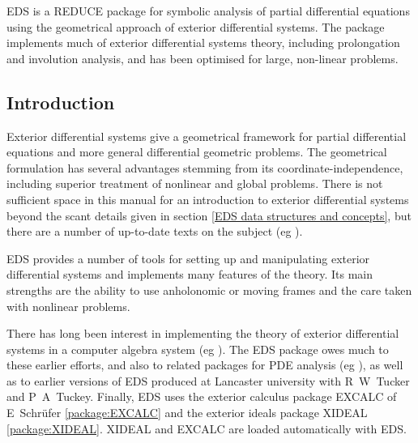 



\newcommand{\deriv}{\mathrm{d}}
\newcommand{\union}{\cup}
\renewcommand{\R}{\hbox{\bf R}}
\newcommand{\del}{\partial}
\newcommand{\optional}[1]{$\,[$#1$]\,$}
\newenvironment{edssyntax}
   {\begin{list}{}{\tt}\item[]}
   {\end{list}}



EDS is a REDUCE package for symbolic analysis of partial differential
equations using the geometrical approach of exterior differential
systems. The package implements much of exterior differential systems
theory, including prolongation and involution analysis, and has been
optimised for large, non-linear problems. 



\subsection{Introduction}

Exterior differential systems give a geometrical framework for partial
differential equations and more general differential geometric problems.
The geometrical formulation has several advantages stemming from its
coordinate-independence, including superior treatment of nonlinear and
global problems. There is not sufficient space in this manual for an
introduction to exterior differential systems beyond the scant details
given in section \ref{EDS data structures and concepts}, but there are a
number of up-to-date texts on the subject (eg \cite{Bryant:1991,Spivak:1979}). 

EDS provides a number of tools for setting up and manipulating exterior
differential systems and implements many features of the theory. Its main
strengths are the ability to use anholonomic or moving frames and the care
taken with nonlinear problems.

There has long been interest in implementing the theory of exterior
differential systems in a computer algebra system (eg
\cite{Arais:1974,Ganzha:1981,Hartley:91}). The EDS package owes much to these
earlier efforts, and also to related packages for PDE analysis (eg
\cite{Mansfield:1993,reid_1991,Seiler:1995}), as well as to earlier versions of
EDS produced at Lancaster university with R~W~Tucker and
P~A~Tuckey. Finally, EDS uses the exterior calculus package EXCALC of
E~Schr{\"u}fer \ref{package:EXCALC} and the exterior ideals package XIDEAL
\ref{package:XIDEAL}. XIDEAL and EXCALC are loaded automatically with EDS.

